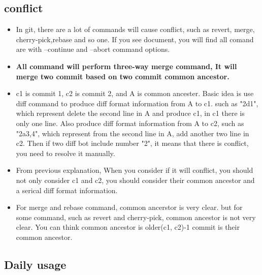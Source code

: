 \documentclass[a4paper,11pt,twoside]{book}
\begin{document}
\subsection{conflict}
\begin{itemize}
		\item In git, there are a lot of commands will cause conflict, such as revert, merge, cherry-pick,rebase and so one. If you see document, you will find all comand are with --continue and --abort command options.

		\item \textbf{All command will perform three-way merge command, It will merge two commit based on two commit common ancestor.}

		\item c1 is commit 1, c2 is commit 2, and A is common ancester. Basic idea is use diff command to produce diff format information from A to c1. such as "2d1", which represent delete the second line in A and produce c1, in c1 there is only one line.  Also produce diff format information from A to c2, such as "2a3,4", which represent from the second line in A, add another two line in c2. Then if two diff bot include number "2", it means that there is conflict, you need to resolve it manually. 

		\item From previous explanation, When you consider if it will conflict, you should not only consider c1 and c2, you should consider their common ancestor and a serical diff format information. 

		\item For merge and rebase command, common ancerstor is very clear. but for some command, such as revert and cherry-pick, common ancestor is not very clear. You can think common ancestor is older(c1, c2)-1 commit is their common ancestor.  
		
\end{itemize}

\subsection{Daily usage}
\end{document}
